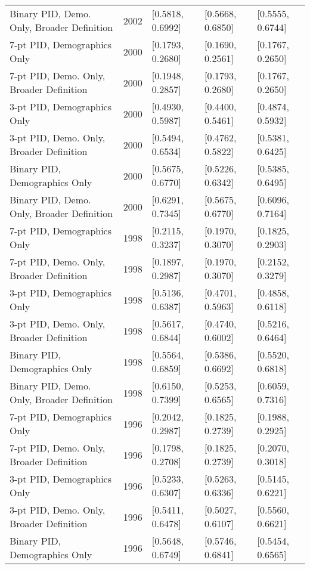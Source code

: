 \begin{longtable}{lrlll}
  Binary PID, Demo. Only, Broader Definition & 2002 & [0.5818, 0.6992] & [0.5668, 0.6850] & [0.5555, 0.6744] \\ 
  7-pt PID, Demographics Only & 2000 & [0.1793, 0.2680] & [0.1690, 0.2561] & [0.1767, 0.2650] \\ 
  7-pt PID, Demo. Only, Broader Definition & 2000 & [0.1948, 0.2857] & [0.1793, 0.2680] & [0.1767, 0.2650] \\ 
  3-pt PID, Demographics Only & 2000 & [0.4930, 0.5987] & [0.4400, 0.5461] & [0.4874, 0.5932] \\ 
  3-pt PID, Demo. Only, Broader Definition & 2000 & [0.5494, 0.6534] & [0.4762, 0.5822] & [0.5381, 0.6425] \\ 
  Binary PID, Demographics Only & 2000 & [0.5675, 0.6770] & [0.5226, 0.6342] & [0.5385, 0.6495] \\ 
  Binary PID, Demo. Only, Broader Definition & 2000 & [0.6291, 0.7345] & [0.5675, 0.6770] & [0.6096, 0.7164] \\ 
  7-pt PID, Demographics Only & 1998 & [0.2115, 0.3237] & [0.1970, 0.3070] & [0.1825, 0.2903] \\ 
  7-pt PID, Demo. Only, Broader Definition & 1998 & [0.1897, 0.2987] & [0.1970, 0.3070] & [0.2152, 0.3279] \\ 
  3-pt PID, Demographics Only & 1998 & [0.5136, 0.6387] & [0.4701, 0.5963] & [0.4858, 0.6118] \\ 
  3-pt PID, Demo. Only, Broader Definition & 1998 & [0.5617, 0.6844] & [0.4740, 0.6002] & [0.5216, 0.6464] \\ 
  Binary PID, Demographics Only & 1998 & [0.5564, 0.6859] & [0.5386, 0.6692] & [0.5520, 0.6818] \\ 
  Binary PID, Demo. Only, Broader Definition & 1998 & [0.6150, 0.7399] & [0.5253, 0.6565] & [0.6059, 0.7316] \\ 
  7-pt PID, Demographics Only & 1996 & [0.2042, 0.2987] & [0.1825, 0.2739] & [0.1988, 0.2925] \\ 
  7-pt PID, Demo. Only, Broader Definition & 1996 & [0.1798, 0.2708] & [0.1825, 0.2739] & [0.2070, 0.3018] \\ 
  3-pt PID, Demographics Only & 1996 & [0.5233, 0.6307] & [0.5263, 0.6336] & [0.5145, 0.6221] \\ 
  3-pt PID, Demo. Only, Broader Definition & 1996 & [0.5411, 0.6478] & [0.5027, 0.6107] & [0.5560, 0.6621] \\ 
  Binary PID, Demographics Only & 1996 & [0.5648, 0.6749] & [0.5746, 0.6841] & [0.5454, 0.6565] \\ 

\end{longtable}
